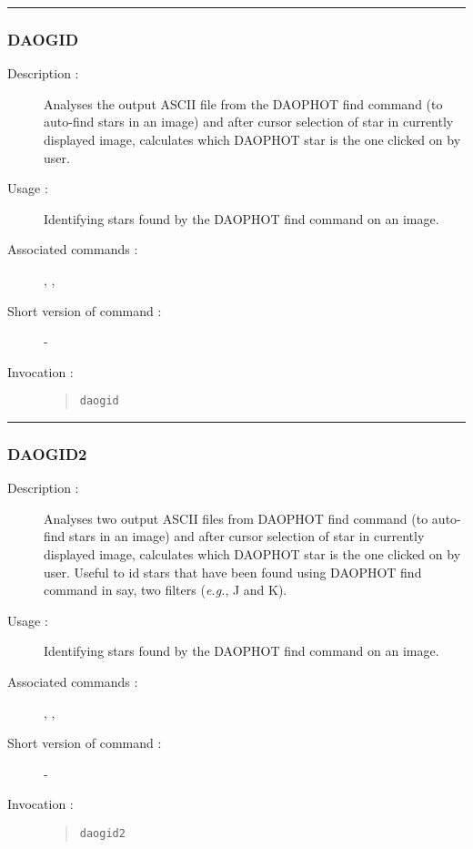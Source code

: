 \hrule
\subsubsection*{\label{DAOGID}DAOGID}

\begin{description}

\item[Description :] Analyses the output ASCII file from the DAOPHOT
find command (to auto-find stars in an image) and after cursor
selection of star in currently displayed image, calculates which
DAOPHOT star is the one clicked on by user.

\item[Usage :] Identifying stars found by the DAOPHOT find command on an image.

\item[Associated commands :] {\tt {}},
{\tt {}}, {\tt {}}

\item[Short version of command :] -

\item[Invocation :]

\begin{quote}{\tt  daogid }\end{quote}

\end{description}

\hrule
\subsubsection*{\label{DAOGID2}DAOGID2}

\begin{description}

\item[Description :] Analyses two output ASCII files from DAOPHOT find
command (to auto-find stars in an image) and after cursor selection of
star in currently displayed image, calculates which DAOPHOT star is the
one clicked on by user.  Useful to id stars that have been found using
DAOPHOT find command in say, two filters (\emph{e.g.}, J and K).

\item[Usage :] Identifying stars found by the DAOPHOT find command on an image.
\item[Associated commands :] {\tt {}},
{\tt {}}, {\tt {}}

\item[Short version of command :] -

\item[Invocation :]

\begin{quote}{\tt  daogid2 }\end{quote}

\end{description}

